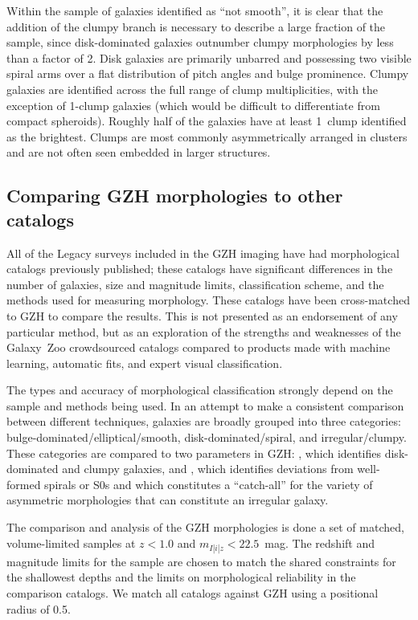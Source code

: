 \documentclass[twocolumn]{aastex6}
\begin{document}
Within the sample of galaxies identified as ``not smooth'', it is clear that
the addition of the clumpy branch is necessary to describe a large fraction of
the sample, since disk-dominated galaxies outnumber clumpy morphologies by less than
a factor of 2. Disk galaxies are primarily unbarred \citet{mel14} and
possessing two visible spiral arms over a flat distribution of pitch angles and
bulge prominence. Clumpy galaxies are identified across the full range of clump
multiplicities, with the exception of 1-clump galaxies (which would be
difficult to differentiate from compact spheroids). Roughly half of the
galaxies have at least 1~clump identified as the brightest. Clumps are most
commonly asymmetrically arranged in clusters and are not often seen embedded in
larger structures. 

\subsection{Comparing GZH morphologies to other catalogs}\label{ssec:comparisons}

All of the Legacy surveys included in the GZH imaging have had morphological
catalogs previously published; these catalogs have significant differences in
the number of galaxies, size and magnitude limits, classification scheme, and
the methods used for measuring morphology. These catalogs have been
cross-matched to GZH to compare the results. This is not presented as an
endorsement of any particular method, but as an exploration of the strengths
and weaknesses of the Galaxy~Zoo crowdsourced catalogs compared to products
made with machine learning, automatic fits, and expert visual classification. 

The types and accuracy of morphological classification strongly depend on the
sample and methods being used. In an attempt to make a consistent comparison
between different techniques, galaxies are broadly grouped into three
categories: bulge-dominated/elliptical/smooth, disk-dominated/spiral, and
irregular/clumpy. These categories are compared to two parameters in GZH:
\fbest, which identifies disk-dominated and clumpy galaxies, and \fodd, which
identifies deviations from well-formed spirals or S0s and which constitutes a
``catch-all'' for the variety of asymmetric morphologies that can constitute an
irregular galaxy. 

The comparison and analysis of the GZH morphologies is done a set of matched,
volume-limited samples at $z<1.0$ and $m_{I|i|z} < 22.5$~mag.  The redshift and
magnitude limits for the sample are chosen to match the shared constraints for
the shallowest depths \citep[GEMS;][]{bun05} and the limits on morphological
reliability \citep[COSMOS/ZEST;][]{sca07} in the comparison catalogs. We match
all catalogs against GZH using a positional radius of 0.5\arcsec.
\end{document}
